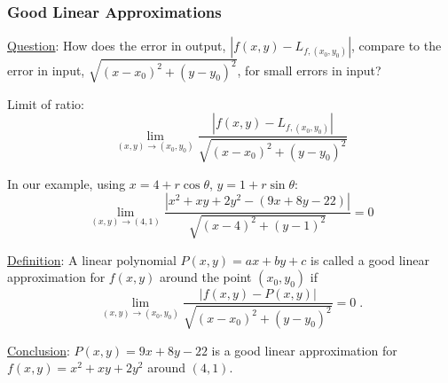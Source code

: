 
\begin{frame}
\frametitle{Good Linear Approximations}

\underline{Question}: How does the error in output, $|f(x,y) - L_{f,(x_0,y_0)}|$, compare to the error in input, $\sqrt{(x-x_0)^2 + (y-y_0)^2}$, for small errors in input?

\pause Limit of ratio:
%
$$\lim_{(x,y) \to (x_0,y_0)} \frac{|f(x,y) - L_{f,(x_0,y_0)}|}{\sqrt{(x-x_0)^2 + (y-y_0)^2}}$$

\pause In our example, using $x=4+r\cos{\theta}$, $y=1+r\sin{\theta}$:
%
$$\lim_{(x,y) \to (4,1)} \frac{|x^2+xy+2y^2 - (9x+8y -22)|}{\sqrt{(x-4)^2+(y-1)^2}} = 0$$
%

\pause \underline{Definition}: A linear polynomial $P(x,y) = ax+by+c$ is called a \textcolor[rgb]{0.98,0.00,0.00}{good linear approximation} for $f(x,y)$ around the point $(x_0,y_0)$ if
%
$$\lim_{(x,y) \to (x_0,y_0)} \frac{|f(x,y) - P(x,y)|}{\sqrt{(x-x_0)^2 + (y-y_0)^2}} = 0\; .$$

\pause \underline{Conclusion}: $P(x,y) = 9x+8y-22$ is a good linear approximation for $f(x,y) = x^2+xy+2y^2$ around $(4,1)$.
\end{frame}